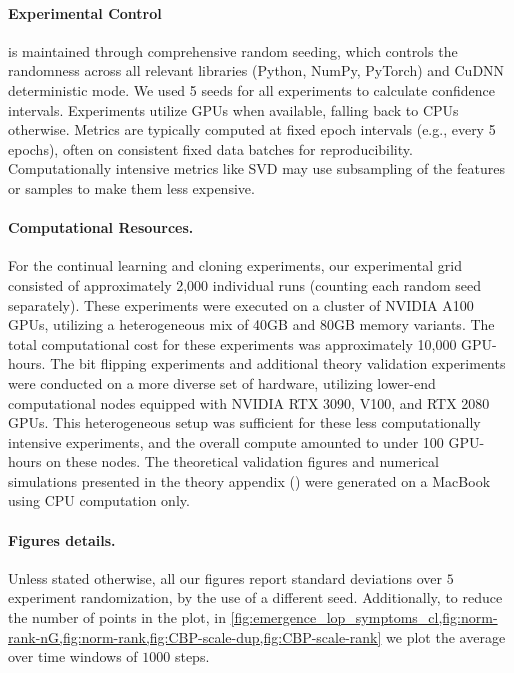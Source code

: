 \documentclass{article}
\numberwithin{figure}{section}
\begin{document}
\paragraph{Experimental Control} is maintained through comprehensive random seeding, which controls the randomness across all relevant libraries (Python, NumPy, PyTorch) and CuDNN deterministic mode.  We used 5 seeds for all experiments to calculate confidence intervals. Experiments utilize GPUs when available, falling back to CPUs otherwise. Metrics are typically computed at fixed epoch intervals (e.g., every 5 epochs), often on consistent fixed data batches for reproducibility. Computationally intensive metrics like SVD may use subsampling of the features or samples to make them less expensive. 
\paragraph{Computational Resources.}
For the continual learning and cloning experiments, our experimental grid consisted of approximately 2,000 individual runs (counting each random seed separately). These experiments were executed on a cluster of NVIDIA A100 GPUs, utilizing a heterogeneous mix of 40GB and 80GB memory variants. The total computational cost for these experiments was approximately 10,000 GPU-hours.
The bit flipping experiments and additional theory validation experiments were conducted on a more diverse set of hardware, utilizing lower-end computational nodes equipped with NVIDIA RTX 3090, V100, and RTX 2080 GPUs. This heterogeneous setup was sufficient for these less computationally intensive experiments, and the overall compute amounted to under 100 GPU-hours on these nodes.
The theoretical validation figures and numerical simulations presented in the theory appendix () were generated on a MacBook using CPU computation only.
\paragraph{Figures details.} 
Unless stated otherwise, all our figures report standard deviations over $5$ experiment randomization, by the use of a different seed. Additionally, to reduce the number of points in the plot, in 
\cref{fig:emergence_lop_symptoms_cl,fig:norm-rank-nG,fig:norm-rank,fig:CBP-scale-dup,fig:CBP-scale-rank} we plot the average over time windows of $1000$ steps. 
\end{document}
